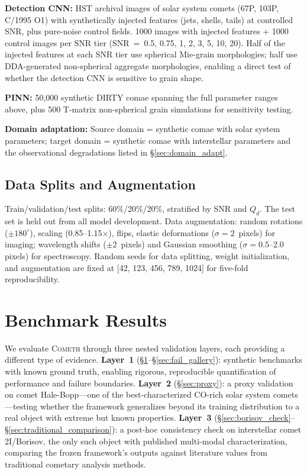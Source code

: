 \documentclass[usenatbib]{mnras}
\begin{document}
\textbf{Detection CNN:} HST archival images of solar system comets (67P, 103P, C/1995 O1) with synthetically injected features (jets, shells, tails) at controlled SNR, plus pure-noise control fields. 1000 images with injected features + 1000 control images per SNR tier (SNR~=~0.5, 0.75, 1, 2, 3, 5, 10, 20). Half of the injected features at each SNR tier use spherical Mie-grain morphologies; half use DDA-generated non-spherical aggregate morphologies, enabling a direct test of whether the detection CNN is sensitive to grain shape.

\textbf{PINN:} 50,000 synthetic DIRTY comae spanning the full parameter ranges above, plus 500 T-matrix non-spherical grain simulations for sensitivity testing.

\textbf{Domain adaptation:} Source domain = synthetic comae with solar system parameters; target domain = synthetic comae with interstellar parameters and the observational degradations listed in \S\ref{sec:domain_adapt}.

\subsection{Data Splits and Augmentation}

Train/validation/test splits: 60\%/20\%/20\%, stratified by SNR and $Q_d$. The test set is held out from all model development. Data augmentation: random rotations ($\pm 180^\circ$), scaling (0.85--1.15$\times$), flips, elastic deformations ($\sigma = 2$~pixels) for imaging; wavelength shifts ($\pm 2$~pixels) and Gaussian smoothing ($\sigma = 0.5$--2.0 pixels) for spectroscopy. Random seeds for data splitting, weight initialization, and augmentation are fixed at [42, 123, 456, 789, 1024] for five-fold reproducibility.


\section{Benchmark Results}\label{sec:results}

We evaluate \textsc{Cometh} through three nested validation layers, each providing a different type of evidence. \textbf{Layer~1} (\S\ref{sec:results}--\S\ref{sec:fail_gallery}): synthetic benchmarks with known ground truth, enabling rigorous, reproducible quantification of performance and failure boundaries. \textbf{Layer~2} (\S\ref{sec:proxy}): a proxy validation on comet Hale-Bopp---one of the best-characterized CO-rich solar system comets---testing whether the framework generalizes beyond its training distribution to a real object with extreme but known properties. \textbf{Layer~3} (\S\ref{sec:borisov_check}--\S\ref{sec:traditional_comparison}): a post-hoc consistency check on interstellar comet 2I/Borisov, the only such object with published multi-modal characterization, comparing the frozen framework's outputs against literature values from traditional cometary analysis methods.
\end{document}
